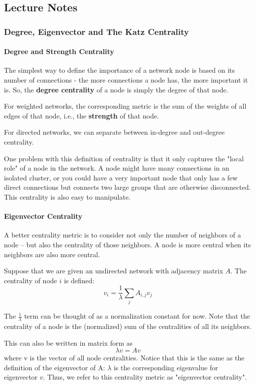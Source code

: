 \documentclass[11pt]{scrartcl} %
\begin{document}
\subsection{Lecture Notes}

\subsubsection{Degree, Eigenvector and The Katz Centrality}
\paragraph{Degree and Strength Centrality} 
The simplest way to define the importance of a network node is based on its number of connections - the more connections a node has, the more important it is. So, the \textbf{degree centrality} of a node is simply the degree of that node.

For weighted networks, the corresponding metric is the sum of the weights of all edges of that node, i.e., the \textbf{strength} of that node.

For directed networks, we can separate between in-degree and out-degree centrality.

One problem with this definition of centrality is that it only captures the "local role" of a node in the network. A node might have many connections in an isolated cluster, or you could have a very important node that only has a few direct connections but connects two large groups that are otherwise disconnected. This centrality is also easy to manipulate.

\paragraph{Eigenvector Centrality}
A better centrality metric is to consider not only the number of neighbors of a node -- but also the centrality of those neighbors. A node is more central when its neighbors are also more central.

Suppose that we are given an undirected network with adjacency matrix $A$. The centrality of node $i$ is defined:
\[ v_i = \frac{1}{\lambda} \sum_{j} A_{i,j} v_j \]

The $\frac{1}{\lambda}$ term can be thought of as a normalization constant for now. Note that the centrality of a node is the (normalized) sum of the centralities of all its neighbors.

This can also be written in matrix form as 
\[ \lambda v = A v\]
where v is the vector of all node centralities. Notice that this is the same as the definition of the eigenvector of A: $\lambda$ is the corresponding eigenvalue for eigenvector $v$. Thus, we refer to this centrality metric as "eigenvector centrality".
\end{document}
